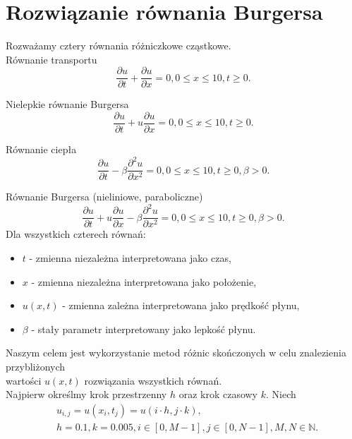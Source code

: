\documentclass[12pt, a4paper]{article}
\begin{document}
\section{Rozwiązanie równania Burgersa}
Rozważamy cztery równania różniczkowe cząstkowe.\\

Równanie transportu
\begin{equation}
\frac{\partial u}{\partial t}+\frac{\partial u}{\partial x}=0, 0\leqslant x\leqslant10, t\geqslant0.
\end{equation}
\vspace{0.5cm}

Nielepkie równanie Burgersa
\begin{equation}
\frac{\partial u}{\partial t}+u\frac{\partial u}{\partial x}=0, 0\leqslant x\leqslant10, t\geqslant0.
\end{equation}
\vspace{0.5cm}

Równanie ciepła
\begin{equation}
\frac{\partial u}{\partial t}-\beta\frac{\partial^{2} u}{\partial x^{2}}=0, 0\leqslant x\leqslant10, t\geqslant0, \beta>0.
\end{equation}
\vspace{0.5cm}

Równanie Burgersa (nieliniowe, paraboliczne)
\begin{equation}
\frac{\partial u}{\partial t}+u\frac{\partial u}{\partial x}-\beta\frac{\partial^{2} u}{\partial x^{2}}=0, 0\leqslant x\leqslant10, t\geqslant0, \beta>0.
\end{equation}
Dla wszystkich czterech równań:\\
\begin{itemize}
\item $t$ - zmienna niezależna interpretowana jako czas,
\item $x$ - zmienna niezależna interpretowana jako położenie,
\item $u(x,t)$ - zmienna zależna interpretowana jako prędkość płynu,
\item $\beta$ - stały parametr interpretowany jako lepkość płynu.
\end{itemize}
\vspace{0.5cm}

Naszym celem jest wykorzystanie metod różnic skończonych w celu znalezienia przybliżonych\\
wartości $u(x,t)$ rozwiązania wszystkich równań.\\
Najpierw określmy krok przestrzenny $h$ oraz krok czasowy $k$. Niech
\begin{equation}
\begin{split}
& u_{i,j}=u(x_{i},t_{j})=u(i\cdot h,j\cdot k),\\
& h=0.1, k=0.005, i\in[0,M-1], j\in[0,N-1], M,N\in\mathbb{N}.
\end{split}
\end{equation}
\end{document}
